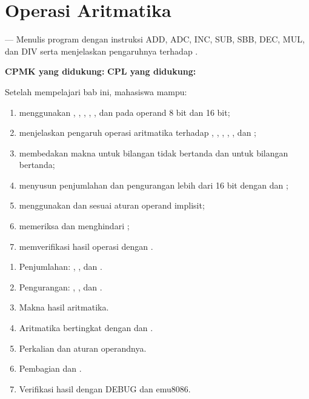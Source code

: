 \documentclass[../../main.tex]{subfiles}
\begin{document}
\chapter{Operasi Aritmatika}
\label{chap:aritmatika}


\begin{subcpmkbox}
\vspace{1.1em}
 --- Menulis program dengan instruksi ADD, ADC, INC,
SUB, SBB, DEC, MUL, dan DIV serta menjelaskan pengaruhnya terhadap
.

\vspace{0.4em}
\textbf{CPMK yang didukung:}  \quad\textbullet\quad
\textbf{CPL yang didukung:} 
\end{subcpmkbox}

\begin{tujuanbox}
\vspace{1.1em}
Setelah mempelajari bab ini, mahasiswa mampu:
\begin{enumerate}
    \item menggunakan , , , ,
          , dan  pada operand 8 bit dan 16 bit;
    \item menjelaskan pengaruh operasi aritmatika terhadap
          , , , , , dan
          ;
    \item membedakan makna  untuk bilangan tidak bertanda
          dan  untuk bilangan bertanda;
    \item menyusun penjumlahan dan pengurangan lebih dari 16 bit
          dengan  dan ;
    \item menggunakan  dan  sesuai aturan operand
          implisit;
    \item memeriksa dan menghindari ;
    \item memverifikasi hasil operasi dengan .
\end{enumerate}
\end{tujuanbox}

\begin{materibox}
\vspace{1.1em}
\begin{enumerate}
    \item Penjumlahan: , , dan .
    \item Pengurangan: , , dan .
    \item Makna  hasil aritmatika.
    \item Aritmatika bertingkat dengan  dan .
    \item Perkalian  dan aturan operandnya.
    \item Pembagian  dan .
    \item Verifikasi hasil dengan DEBUG dan emu8086.
\end{enumerate}
\end{materibox}










\end{document}
